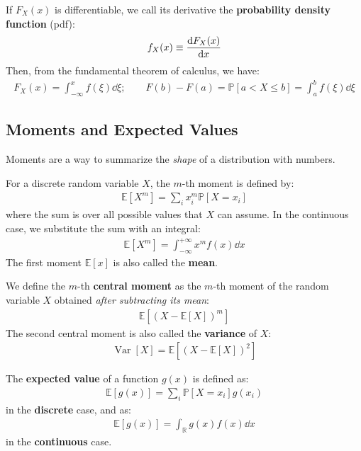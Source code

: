 \documentclass[../template.tex]{subfiles}
\begin{document}
\medskip

If $F_X(x)$ is differentiable, we call its derivative the \textbf{probability density function} (pdf):
\begin{align*}
    f_X(x) \equiv \dv{F_X(x)}{x}
\end{align*} 
Then, from the fundamental theorem of calculus, we have:
\begin{align*}
    F_X(x) = \int_{-\infty}^x f(\xi) \dd{\xi}; \qquad F(b) - F(a) = \mathbb{P}[a < X \leq b] = \int_a^b f(\xi) \dd{\xi}
\end{align*}

\subsection{Moments and Expected Values}
Moments are a way to summarize the \textit{shape} of a distribution with numbers.

\medskip

For a discrete random variable $X$, the $m$-th moment is defined by:
\begin{align*}
    \mathbb{E}[X^m] = \sum_{i} x_i^m \mathbb{P}[X= x_i]
\end{align*}
where the sum is over all possible values that $X$ can assume. In the continuous case, we substitute the sum with an integral:
\begin{align*}
    \mathbb{E}[X^m] = \int_{-\infty}^{+\infty} x^m f(x) \dd{x}
\end{align*}
The first moment $\mathbb{E}[x]$ is also called the \textbf{mean}. 

\medskip

We define the $m$-th \textbf{central moment} as the $m$-th moment of the random variable $X$ obtained \textit{after subtracting its mean}:
\begin{align*}
    \mathbb{E}[(X-\mathbb{E}[X])^m]
\end{align*}  
The second central moment is also called the \textbf{variance} of $X$:
\begin{align*}
    \operatorname{Var}[X] = \mathbb{E}[(X-\mathbb{E}[X])^2] 
\end{align*} 

The \textbf{expected value} of a function $g(x)$ is defined as:
\begin{align}\label{eqn:measure-discrete}
    \mathbb{E}[g(x)] = \sum_{i} \mathbb{P}[X=x_i] g(x_i)
\end{align} 
in the \textbf{discrete} case, and as:
\begin{align}\label{eqn:measure-continuous}
    \mathbb{E}[g(x)] = \int_{\mathbb{R}} g(x) f(x) \dd{x}
\end{align}
in the \textbf{continuous} case.
\end{document}
